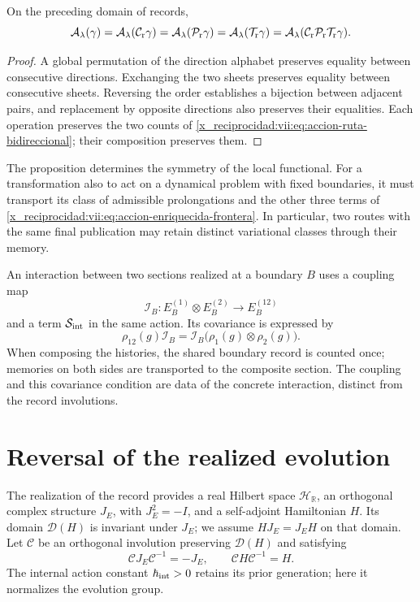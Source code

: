 \begin{proposition}
\label{x_reciprocidad:vii:prop:invariancia-ruta-bidireccional}
On the preceding domain of records,
\[
 \mathcal A_\lambda(\gamma)
 =\mathcal A_\lambda(\mathcal C_{\rm r}\gamma)
 =\mathcal A_\lambda(\mathcal P_{\rm r}\gamma)
 =\mathcal A_\lambda(\mathcal T_{\rm r}\gamma)
 =\mathcal A_\lambda(\mathcal C_{\rm r}\mathcal P_{\rm r}
                              \mathcal T_{\rm r}\gamma).
\]
\end{proposition}
\begin{proof}
A global permutation of the direction alphabet preserves equality
between consecutive directions. Exchanging the two sheets preserves
equality between consecutive sheets. Reversing the order establishes a
bijection between adjacent pairs, and replacement by opposite directions
also preserves their equalities. Each operation preserves the two counts
of \eqref{x_reciprocidad:vii:eq:accion-ruta-bidireccional}; their composition preserves them.
\end{proof}

The proposition determines the symmetry of the local functional. For a
transformation also to act on a dynamical problem with fixed boundaries,
it must transport its class of admissible prolongations and the other three
terms of \eqref{x_reciprocidad:vii:eq:accion-enriquecida-frontera}. In particular, two
routes with the same final publication may retain distinct variational
classes through their memory.

An interaction between two sections realized at a boundary \(B\)
uses a coupling map
\[
 \mathcal I_B:E_B^{(1)}\otimes E_B^{(2)}\longrightarrow E_B^{(12)}
\]
and a term \(\mathcal S_{\rm int}\) in the same action. Its covariance
is expressed by
\[
 \rho_{12}(g)\mathcal I_B
 =\mathcal I_B\bigl(\rho_1(g)\otimes\rho_2(g)\bigr).
\]
When composing the histories, the shared boundary record is counted
once; memories on both sides are transported to the composite section.
The coupling and this covariance condition are data of the concrete
interaction, distinct from the record involutions.

\section{Reversal of the realized evolution}
\label{x_reciprocidad:vii:subsec:reversion-evolucion}

The realization of the record provides a real Hilbert space
\(\mathcal H_{\mathbb R}\), an orthogonal complex structure
\(J_E\), with \(J_E^2=-I\), and a self-adjoint Hamiltonian \(H\).
Its domain \(\mathcal D(H)\) is invariant under \(J_E\); we assume
\(HJ_E=J_EH\) on that domain. Let \(\mathcal C\) be an orthogonal
involution preserving \(\mathcal D(H)\) and satisfying
\begin{equation}
 \mathcal C J_E\mathcal C^{-1}=-J_E,\qquad
 \mathcal C H\mathcal C^{-1}=H.
 \label{x_reciprocidad:vii:eq:dominio-reversion-evolucion}
\end{equation}
The internal action constant \(\hbar_{\rm int}>0\) retains its
prior generation; here it normalizes the evolution group.

